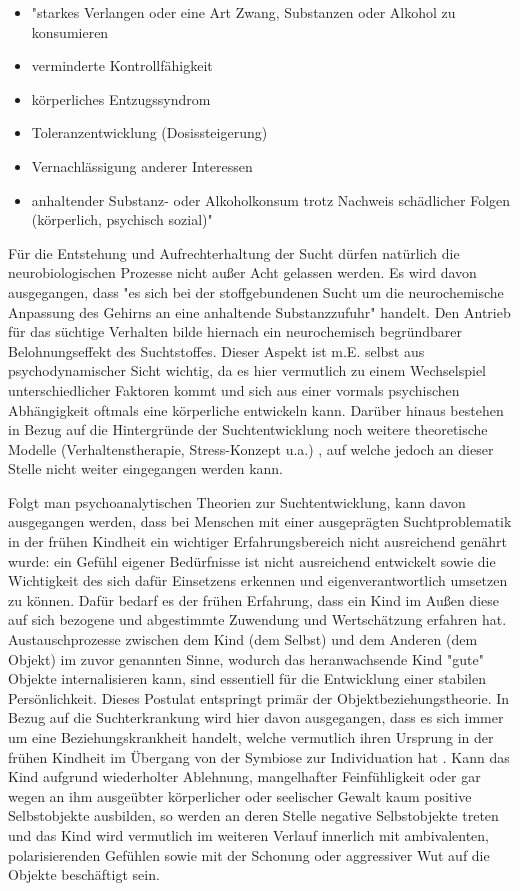 \begin{itemize}
\item "starkes Verlangen oder eine Art Zwang, Substanzen oder Alkohol zu konsumieren
\item verminderte Kontrollfähigkeit
\item körperliches Entzugssyndrom
\item Toleranzentwicklung (Dosissteigerung)
\item Vernachlässigung anderer Interessen
\item anhaltender Substanz- oder Alkoholkonsum trotz Nachweis schädlicher Folgen (körperlich, psychisch sozial)" \autocite[315]{moeller2009}
\end{itemize}

Für die Entstehung und Aufrechterhaltung der Sucht dürfen natürlich die neurobiologischen Prozesse nicht außer Acht gelassen werden. Es wird davon ausgegangen, dass "es sich bei der stoffgebundenen Sucht um die neurochemische Anpassung des Gehirns an eine anhaltende Substanzzufuhr" \autocite[14]{tretter2008} handelt. Den Antrieb für das süchtige Verhalten bilde hiernach ein neurochemisch begründbarer Belohnungseffekt des Suchtstoffes. Dieser Aspekt ist m.E. selbst aus psychodynamischer Sicht wichtig, da es hier vermutlich zu einem Wechselspiel unterschiedlicher Faktoren kommt und sich aus einer vormals psychischen Abhängigkeit oftmals eine körperliche entwickeln kann.
Darüber hinaus bestehen in Bezug auf die Hintergründe der Suchtentwicklung noch weitere theoretische Modelle (Verhaltenstherapie, Stress-Konzept u.a.) \autocite[vgl.][38ff.]{tretter2008}, auf welche jedoch an dieser Stelle nicht weiter eingegangen werden kann.
 
Folgt man psychoanalytischen Theorien zur Suchtentwicklung, kann davon ausgegangen werden, dass bei Menschen mit einer ausgeprägten Suchtproblematik in der frühen Kindheit ein wichtiger Erfahrungsbereich nicht ausreichend genährt wurde: ein Gefühl eigener Bedürfnisse ist nicht ausreichend entwickelt sowie die Wichtigkeit des sich dafür Einsetzens erkennen und eigenverantwortlich umsetzen zu können. Dafür bedarf es der frühen Erfahrung, dass ein Kind im Außen diese auf sich bezogene und abgestimmte Zuwendung und Wertschätzung erfahren hat. Austauschprozesse zwischen dem Kind (dem Selbst) und dem Anderen (dem Objekt) im zuvor genannten Sinne, wodurch das heranwachsende Kind "gute" Objekte internalisieren kann, sind essentiell für die Entwicklung einer stabilen Persönlichkeit. Dieses Postulat entspringt primär der Objektbeziehungstheorie. In Bezug auf die Suchterkrankung wird hier davon ausgegangen, dass es sich immer um eine Beziehungskrankheit handelt, welche vermutlich ihren Ursprung in der frühen Kindheit im Übergang von der Symbiose zur Individuation hat \autocite[vgl.][9]{weidlinger2012}. Kann das Kind aufgrund wiederholter Ablehnung, mangelhafter Feinfühligkeit oder gar wegen an ihm ausgeübter körperlicher oder seelischer Gewalt kaum positive Selbstobjekte ausbilden, so werden an deren Stelle negative Selbstobjekte treten und das Kind wird vermutlich im weiteren Verlauf innerlich mit ambivalenten, polarisierenden Gefühlen sowie mit der Schonung oder aggressiver Wut auf die Objekte beschäftigt sein\autocite[vgl.][10]{weidlinger2012}. 

